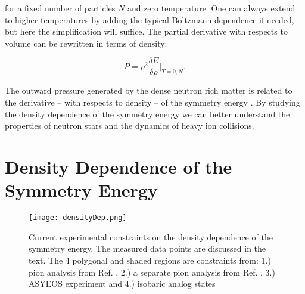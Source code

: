 for a fixed number of particles $N$ and zero temperature. One can always extend to higher temperatures by adding the typical Boltzmann dependence if needed, but here the simplification will suffice. The partial derivative with respects to volume can be rewritten in terms of density:

\begin{equation}
P = \rho^2 \frac{\delta E}{\delta\rho}\vert_{T=0,N}.
\label{eq:densEos}
\end{equation}

The outward pressure generated  by the dense neutron rich matter is related to the derivative -- with respects to density  -- of the symmetry energy \cite{tovEq}. By studying the density dependence of the symmetry energy we can better understand the properties of neutron stars and the dynamics of heavy ion collisions. 

\section{Density Dependence of the Symmetry Energy}

\begin{figure}[!htb]
\centering
\texttt{[image: densityDep.png]}
\caption{Current experimental constraints on the density dependence of the symmetry energy. The measured data points are discussed in the text. The 4 polygonal and shaded regions are constraints from: 1.) pion analysis from Ref. \cite{xia2009,xie2013}, 2.) a separate pion analysis from Ref. \cite{feng2010}, 3.) ASYEOS experiment \cite{russo2011, russo2016, cozma2013} and 4.) isobaric analog states \cite{dan2014} }
\label{fig:symDen}
\end{figure}

